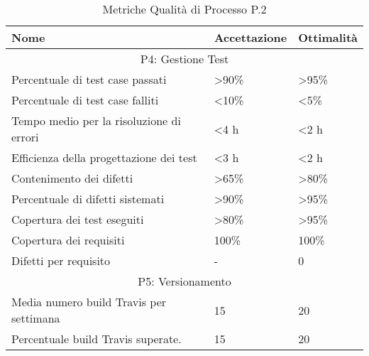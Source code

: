 \begin{table}[!htpb]
	\centering
	\renewcommand{\arraystretch}{2} 
		\begin{tabular}{|p{8cm}|p{3.5cm}|p{3.5cm}|}
		\hline
		\rowcolor{orange!50} 
		\textbf{Nome} & \textbf{Accettazione} & \textbf{Ottimalità} \\
		\hline
		\multicolumn{3}{|c|}{P4: Gestione Test} \\
		\hline 
		Percentuale di test case passati        & >90\%     & >95\%   \\
		\hline
			Percentuale di test case falliti        & <10\%     & <5\%   \\
		\hline
		Tempo medio per la risoluzione di errori
		& <4 h      & <2 h   \\
		\hline
		Efficienza della progettazione dei test & <3 h      & <2 h  \\
		\hline
			Contenimento dei difetti                & >65\%     & >80\%  \\
		\hline
		Percentuale di difetti sistemati        & >90\%     & >95\%  \\
		\hline
		Copertura dei test eseguiti             & >80\%     & >95\%  \\
		\hline
		Copertura dei requisiti                 & 100\%     & 100\%  \\
		\hline
		Difetti per requisito                   & -         & 0   \\
		\hline
		\multicolumn{3}{|c|}{P5: Versionamento} \\
		\hline
		Media numero build Travis per settimana & 15 & 20 \\
		\hline
		Percentuale build Travis superate. & 15 & 20 \\
		\hline
	\end{tabular}
	\caption{Metriche Qualità di Processo P.2}
\end{table}
\clearpage

